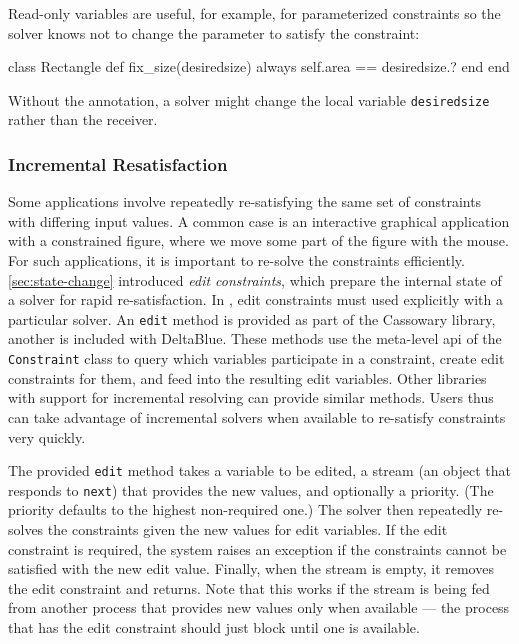 Read-only variables are useful, for example, for parameterized
constraints so the solver knows not to change the parameter to satisfy
the constraint:
\begin{code}
class Rectangle
  def fix_size(desiredsize)
    always { self.area == desiredsize.? }
  end
end
\end{code}

Without the annotation, a solver might
change the local variable \lstinline{desiredsize} rather than the
receiver.


\subsubsection{Incremental Resatisfaction}
Some applications involve repeatedly re-satisfying the same set of
constraints with differing input values.  A common case is an
interactive graphical application with a constrained figure, where we
move some part of the figure with the mouse.  For such applications,
it is important to re-solve the constraints
efficiently. \autoref{sec:state-change} introduced \emph{edit
  constraints}, which prepare the internal state of a solver for rapid
re-satisfaction.
In \toolname, edit constraints must used explicitly with a particular
solver. An \lstinline{edit} method is provided as part of the
Cassowary library, another is included with DeltaBlue.  These methods
use the meta-level \ac{api} of the \lstinline{Constraint} class to
query which variables participate in a constraint, create edit
constraints for them, and feed \DIFdelbegin {}\DIFdelend \DIFaddbegin {}\DIFaddend into the resulting edit
variables.  Other libraries with support for incremental resolving can
provide similar methods. Users thus can take advantage of incremental
solvers when available to re-satisfy constraints very quickly.

The provided \lstinline{edit} method takes a variable to be edited, a
stream (an object that responds to \lstinline{next}) that provides the
new values, and optionally a priority.  (The priority defaults to the
highest non-required one.)  The solver then repeatedly re-solves 
the constraints given the new values for edit variables.  If the edit
constraint is required, the system
raises an exception if the constraints cannot be satisfied with the
new edit value.  Finally, when the
stream is empty, it removes the edit constraint and returns.  Note
that this works if the stream is being fed from another process that
provides new values only when available --- the process that has the
edit constraint should just block until one is available.

